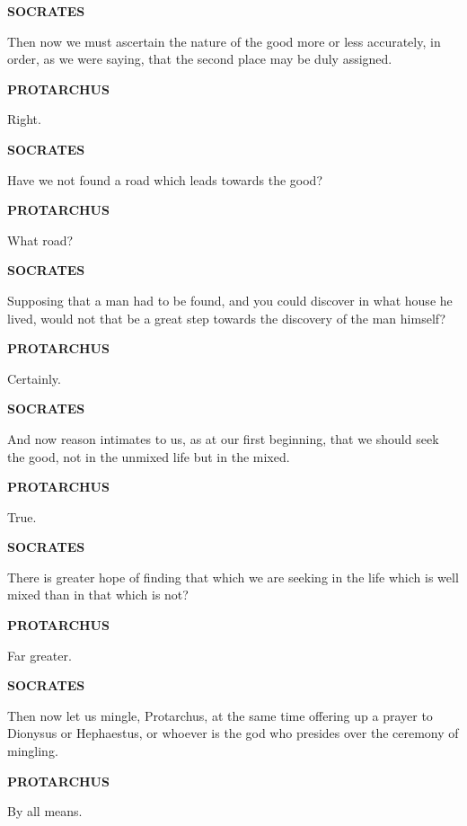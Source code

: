 \documentclass[11pt,letter]{article}
\begin{document}
\par \textbf{SOCRATES}
\par   Then now we must ascertain the nature of the good more or less accurately, in order, as we were saying, that the second place may be duly assigned.

\par \textbf{PROTARCHUS}
\par   Right.

\par \textbf{SOCRATES}
\par   Have we not found a road which leads towards the good?

\par \textbf{PROTARCHUS}
\par   What road?

\par \textbf{SOCRATES}
\par   Supposing that a man had to be found, and you could discover in what house he lived, would not that be a great step towards the discovery of the man himself?

\par \textbf{PROTARCHUS}
\par   Certainly.

\par \textbf{SOCRATES}
\par   And now reason intimates to us, as at our first beginning, that we should seek the good, not in the unmixed life but in the mixed.

\par \textbf{PROTARCHUS}
\par   True.

\par \textbf{SOCRATES}
\par   There is greater hope of finding that which we are seeking in the life which is well mixed than in that which is not?

\par \textbf{PROTARCHUS}
\par   Far greater.

\par \textbf{SOCRATES}
\par   Then now let us mingle, Protarchus, at the same time offering up a prayer to Dionysus or Hephaestus, or whoever is the god who presides over the ceremony of mingling.

\par \textbf{PROTARCHUS}
\par   By all means.
\end{document}
